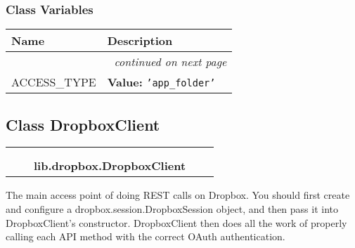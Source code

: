   \subsubsection{Class Variables}

    \vspace{-1cm}
\hspace{\varindent}\begin{longtable}{|p{\varnamewidth}|p{\vardescrwidth}|l}
\cline{1-2}
\cline{1-2} \centering \textbf{Name} & \centering \textbf{Description}& \\
\cline{1-2}
\endhead\cline{1-2}\multicolumn{3}{r}{\small\textit{continued on next page}}\\\endfoot\cline{1-2}
\endlastfoot\raggedright A\-C\-C\-E\-S\-S\-\_\-T\-Y\-P\-E\- & \raggedright \textbf{Value:} 
{\tt \texttt{'}\texttt{app\_folder}\texttt{'}}&\\
\cline{1-2}
\end{longtable}



\subsection{Class DropboxClient}

    \label{lib:dropbox:DropboxClient}
\begin{tabular}{cccccc}
\multicolumn{2}{r}{\settowidth{\BCL}{object}\multirow{2}{\BCL}{object}}
&&
  \\\cline{3-3}
  &&\multicolumn{1}{c|}{}
&&
  \\
&&\multicolumn{2}{l}{\textbf{lib.dropbox.DropboxClient}}
\end{tabular}

The main access point of doing REST calls on Dropbox. You should first 
create and configure a dropbox.session.DropboxSession object, and then pass
it into DropboxClient's constructor. DropboxClient then does all the work 
of properly calling each API method with the correct OAuth authentication.

